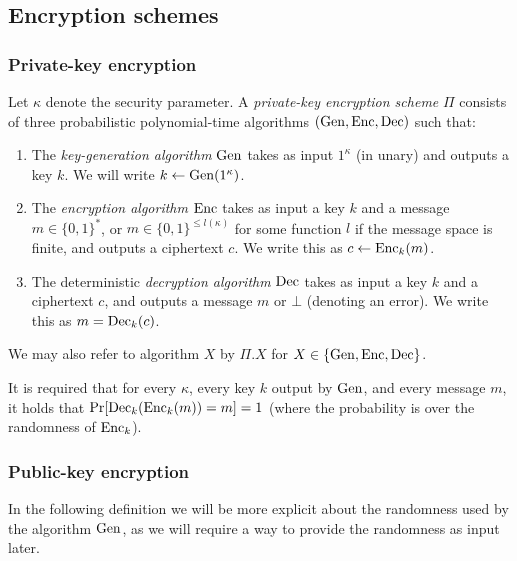 \subsection{Encryption schemes}

\subsubsection{Private-key encryption}

\begin{definition}
	Let $\kappa$ denote the security parameter. A \emph{private-key encryption scheme} $\Pi$ consists of three probabilistic polynomial-time algorithms $(\mathrm{Gen}, \mathrm{Enc}, \mathrm{Dec})$ such that:
	\begin{enumerate}[1.]
		\item The \emph{key-generation algorithm} $\mathrm{Gen}$ takes as input $1^\kappa$ (in unary) and outputs a key $k$. We will write $k \leftarrow \mathrm{Gen}(1^\kappa)$.
		\item The \emph{encryption algorithm} $\mathrm{Enc}$ takes as input a key $k$ and a message $m \in \{0, 1\}^*$, or $m \in \{0, 1\}^{\le l(\kappa)}$ for some function $l$ if the message space is finite, and outputs a ciphertext $c$. We write this as $c \leftarrow \mathrm{Enc}_k(m)$.
		\item The deterministic \emph{decryption algorithm} $\mathrm{Dec}$ takes as input a key $k$ and a ciphertext $c$, and outputs a message $m$ or $\bot$ (denoting an error). We write this as $m = \mathrm{Dec}_{k}(c)$.
	\end{enumerate}

	We may also refer to algorithm $X$ by $\Pi.X$ for $X \in \{\mathrm{Gen}, \mathrm{Enc}, \mathrm{Dec}\}$.

	It is required that for every $\kappa$, every key $k$ output by $\mathrm{Gen}$, and every message $m$, it holds that $\pr{\dec_k(\enc_k(m)) = m} = 1$ (where the probability is over the randomness of $\mathrm{Enc}_k$).
\end{definition}

\subsubsection{Public-key encryption}

In the following definition we will be more explicit about the randomness used by the algorithm $\mathrm{Gen}$, as we will require a way to provide the randomness as input later.

